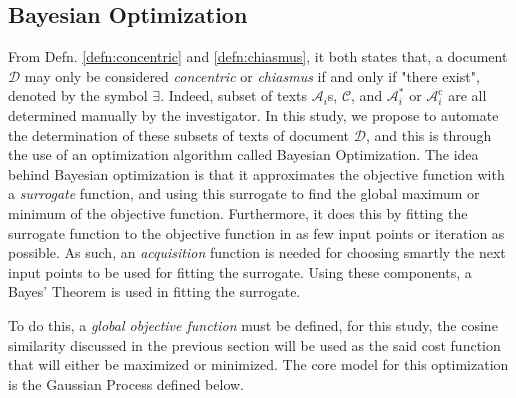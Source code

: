 \subsection{Bayesian Optimization}\label{sec:bayes-opt}
From Defn. \ref{defn:concentric} and \ref{defn:chiasmus}, it both states that, a document $\mathscr{D}$ may only be considered \textit{concentric} or \textit{chiasmus} if and only if "there exist", denoted by the symbol $\exists$. Indeed, subset of texts $\mathscr{A}_i$s, $\mathscr{C}$, and $\mathscr{A}_i^{*}$ or $\mathscr{A}_i^{\text{c}}$ are all determined manually by the investigator. In this study, we propose to automate the determination of these subsets of texts of document $\mathscr{D}$, and this is through the use of an optimization algorithm called Bayesian Optimization. The idea behind Bayesian optimization is that it approximates the objective function with a \textit{surrogate} function, and using this surrogate to find the global maximum or minimum of the objective function. Furthermore, it does this by fitting the surrogate function to the objective function in as few input points or iteration as possible. As such, an \textit{acquisition} function is needed for choosing smartly the next input points to be used for fitting the surrogate. Using these components, a Bayes' Theorem is used in fitting the surrogate.

To do this, a \textit{global objective function} must be defined, for this study, the cosine similarity discussed in the previous section will be used as the said cost function that will either be maximized or minimized. The core model for this optimization is the Gaussian Process defined below.
